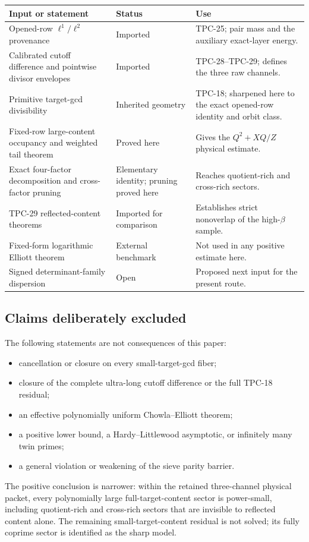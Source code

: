 \begin{center}
\begin{tabular}{>{\raggedright\arraybackslash}p{}
                >{\raggedright\arraybackslash}p{}
                >{\raggedright\arraybackslash}p{}}
\toprule
Input or statement & Status & Use \\
\midrule
Opened-row $\ell^1/\ell^2$ provenance
& Imported & TPC-25; pair mass and the auxiliary exact-layer energy. \\
\addlinespace
Calibrated cutoff difference and pointwise divisor envelopes
& Imported & TPC-28--TPC-29; defines the three raw channels. \\
\addlinespace
Primitive target-gcd divisibility
& Inherited geometry & TPC-18; sharpened here to the exact opened-row
identity and orbit class. \\
\addlinespace
Fixed-row large-content occupancy and weighted tail theorem
& Proved here & Gives the $Q^2+XQ/Z$ physical estimate. \\
\addlinespace
Exact four-factor decomposition and cross-factor pruning
& Elementary identity; pruning proved here & Reaches quotient-rich and
cross-rich sectors. \\
\addlinespace
TPC-29 reflected-content theorems
& Imported for comparison & Establishes strict nonoverlap of the
high-$\beta$ sample. \\
\addlinespace
Fixed-form logarithmic Elliott theorem
& External benchmark & Not used in any positive estimate here. \\
\addlinespace
Signed determinant-family dispersion
& Open & Proposed next input for the present route. \\
\bottomrule
\end{tabular}
\end{center}

\subsection{Claims deliberately excluded}

The following statements are not consequences of this paper:
\begin{itemize}
 \item cancellation or closure on every small-target-gcd fiber;
 \item closure of the complete ultra-long cutoff difference or the
 full TPC-18 residual;
 \item an effective polynomially uniform Chowla--Elliott theorem;
 \item a positive lower bound, a Hardy--Littlewood asymptotic, or
 infinitely many twin primes;
 \item a general violation or weakening of the sieve parity barrier.
\end{itemize}
The positive conclusion is narrower: within the retained three-channel
physical packet, every polynomially large full-target-content sector
is power-small, including quotient-rich and cross-rich sectors that
are invisible to reflected content alone.
The remaining small-target-content residual is not solved; its fully
coprime sector is identified as the sharp model.

